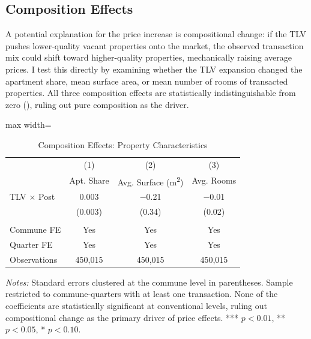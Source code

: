 \documentclass[12pt]{article}
\begin{document}
\begin{table}[H]
\begin{minipage}{0.95\textwidth}
\end{minipage}
\end{table}


\subsection{Composition Effects}

A potential explanation for the price increase is compositional change: if the TLV pushes lower-quality vacant properties onto the market, the observed transaction mix could shift toward higher-quality properties, mechanically raising average prices. I test this directly by examining whether the TLV expansion changed the apartment share, mean surface area, or mean number of rooms of transacted properties. All three composition effects are statistically indistinguishable from zero (), ruling out pure composition as the driver.

\begin{table}[H]
\centering
\caption{Composition Effects: Property Characteristics}
\label{tab:composition}
\begin{adjustbox}{max width=\textwidth}
\begin{tabular}{lccc}
\toprule
 & (1) & (2) & (3) \\
 & Apt. Share & Avg. Surface (m\textsuperscript{2}) & Avg. Rooms \\
\midrule
TLV $\times$ Post & 0.003 & $-$0.21 & $-$0.01 \\
 & (0.003) & (0.34) & (0.02) \\
\\
Commune FE & Yes & Yes & Yes \\
Quarter FE & Yes & Yes & Yes \\
Observations & 450,015 & 450,015 & 450,015 \\
\bottomrule
\end{tabular}
\end{adjustbox}
\begin{minipage}{0.95\textwidth}
\vspace{0.3em}
\footnotesize
\textit{Notes:} Standard errors clustered at the commune level in parentheses. Sample restricted to commune-quarters with at least one transaction. None of the coefficients are statistically significant at conventional levels, ruling out compositional change as the primary driver of price effects. *** $p<0.01$, ** $p<0.05$, * $p<0.10$.
\end{minipage}
\end{table}
\end{document}
